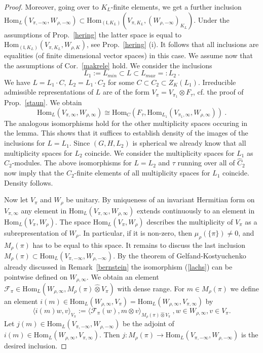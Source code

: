 \documentclass[10]{amsart}
\theoremstyle{remark}
\theoremstyle{definition}
\numberwithin{equation}{section}
\newcommand{\Hom}{\mathrm{Hom}}
\newcommand{\fl}{{\mathfrak l}}
\newcommand{\Cal}{\mathcal}
\begin{document}
{\begin{proof}
Moreover, going over to $K_L$-finite elements, we get a further inclusion $\Hom_{L}(V_{\pi,-\infty},W_{\rho,-\infty})\subset  \Hom_{(\fl,K_L)}(V_{\pi,K_L},(W_{\rho,-\infty})_{K_L})$.
Under the assumptions of Prop.~\ref{hering} the latter space is equal to $\Hom_{(\fl,K_L)}(V_{\pi,K_L},W_{\rho,K})$, see Prop.~\ref{hering} (i). It follows that all inclusions
are equalities (of finite dimensional vector spaces) in this case. We assume now that the assumptions of Cor.~\ref{makrele} hold. We consider the inclusions
$$L_1:=L_{min}\subset L\subset L_{max}=:L_2\ .$$
We have $L=L_1 \cdot C$, $L_2=L_1\cdot C_2$ for some $C\subset C_2\subset Z_{K}(L_1)$. Irreducible admissible representations of $L$ are of the form
$V_\pi=V_{\pi_1}\otimes F_\tau$, cf. the proof of Prop.~\ref{staun}. We obtain
$$ \Hom_{L}(V_{\pi,\infty},W_{\rho,\infty})\cong \Hom_C(F_\tau, \Hom_{L_1}(V_{\pi_1,\infty},W_{\rho,\infty}))\ .$$
The analogous isomorphisms hold for the other multiplicity spaces occuring in the lemma. This shows that it suffices to establish density of the images of the inclusions for $L=L_1$.
Since $(G,H,L_2)$ is spherical we already know that all multiplicity spaces for $L_2$ coincide.
We consider the multiplicity spaces for $L_1$ as $C_2$-modules. The above isomorphisms for $L=L_2$ and $\tau$ running over all of $\hat C_2$ now imply that the $C_2$-finite elements of all multiplicity spaces for $L_1$ coincide.
Density follows.

Now let  $V_\pi$ and $W_\rho$ be unitary. By uniqueness of an invariant Hermitian form on $V_{\pi,\infty}$ any element in $\Hom_{L}(V_{\pi,\infty},W_{\rho,\infty})$
extends continuously to an element in $\Hom_{L}(V_{\pi},W_{\rho})$.  The space $\Hom_{L}(V_{\pi},W_{\rho})$ describes the multiplicity of $V_\pi$ as a subrepresentation
of $W_\rho$. In particular, if it is non-zero, then $\mu_\rho(\{\pi\})\ne 0$, and $M_\rho(\pi)$ has to be equal to this space. It remains to discuss the last
inclusion $M_\rho(\pi)\subset\Hom_L(V_{\pi,-\infty},W_{\rho,-\infty})$. By the theorem of Gelfand-Kostyuchenko already discussed in Remark~\ref{bernstein} the isomorphism
(\ref{lachs}) can be pointwise defined on $W_{\rho,\infty}$. We obtain an element ${\Cal F}_\pi\in \Hom_L(W_{\rho,\infty},  M_\rho(\pi)\hat\otimes V_\pi)$ with dense range. For $m\in M_\rho(\pi)$
we define an element $i(m)\in \Hom_L(W_{\rho,\infty},V_\pi)= \Hom_L(W_{\rho,\infty},V_{\pi,\infty})$ by 
$$ \langle i(m)w,v\rangle_{V_\pi}:= \langle {\Cal F}_\pi (w), m\otimes v\rangle_{M_\rho(\pi)\hat\otimes V_\pi}\ , w\in W_{\rho,\infty}, v\in V_\pi .$$
Let $j(m)\in  \Hom_{L}(V_{\pi,-\infty},W_{\rho,-\infty})$ be the adjoint of $i(m)\in \Hom_L(W_{\rho,\infty},V_{\pi,\infty})$. Then 
$j: M_\rho(\pi)\rightarrow \Hom_{L}(V_{\pi,-\infty},W_{\rho,-\infty})$ is the desired inclusion.
\end{proof}

}
\end{document}
